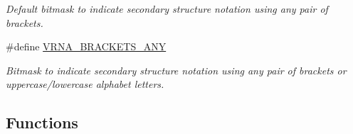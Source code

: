 \begin{DoxyCompactItemize}
\begin{DoxyCompactList}\small\item\em Default bitmask to indicate secondary structure notation using any pair of brackets. \end{DoxyCompactList}\item 
\#define \mbox{\hyperlink{group__struct__utils__dot__bracket_ga013a9da903462d2f2b037f0c6ffb46e4}{V\+R\+N\+A\+\_\+\+B\+R\+A\+C\+K\+E\+T\+S\+\_\+\+A\+NY}}
\begin{DoxyCompactList}\small\item\em Bitmask to indicate secondary structure notation using any pair of brackets or uppercase/lowercase alphabet letters. \end{DoxyCompactList}\end{DoxyCompactItemize}
\subsection*{Functions}
